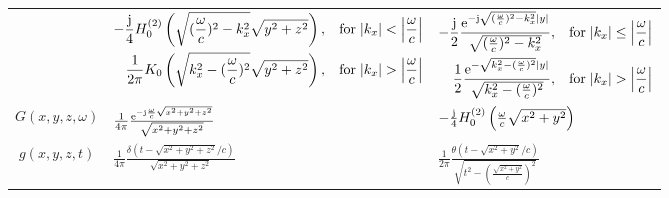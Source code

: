 \begin{table}[h!]
\begin{tabular}[h!]{  c | | l |	 l }
    &      
    \scriptsize
    $\begin{aligned}[t] %
	-\frac{\ti}{4} H_0^{(2)}\left( \sqrt{(\frac{\omega}{c})^2 - k_x^2 } \sqrt{y^2+z^2} \right),\hspace{3mm} \text{for} \hspace{1mm}|k_x|<\left| \frac{\omega}{c} \right| \\ \frac{1}{2\pi} K_0\left( \sqrt{k_x^2 - (\frac{\omega}{c})^2 } \sqrt{y^2+z^2} \right),\hspace{3mm}  \text{for} \hspace{1mm}|k_x|>\left| \frac{\omega}{c} \right| 
	\end{aligned}$ \normalsize
     &     
     \scriptsize	$\begin{aligned}[t]
	-\frac{\ti}{2}\frac{\te^{-\ti\sqrt{(\frac{\omega}{c})^2 - k_x^2 }|y|}}{\sqrt{(\frac{\omega}{c})^2 - k_x^2 }},\hspace{3mm} \text{for} \hspace{1mm}|k_x|		\leq			\left| \frac{\omega}{c} \right| \\
	\frac{1}{2}\frac{\te^{- \sqrt{k_x^2 -(\frac{\omega}{c})^2}|y|}}{\sqrt{k_x^2 -(\frac{\omega}{c})^2}},\hspace{3mm}  \text{for} \hspace{1mm}|k_x|>\left| 					\frac{\omega}{c} \right| 
	\end{aligned}$ \normalsize      \\ 
    $G(x,y,z,\omega)$ 				 &  $\frac{1}{4\pi}\frac{\mathrm{e}^{-\mathrm{j}\frac{\omega}{c}\sqrt{x^2+y^2+z^2}}}{\sqrt{x^2+y^2+z^2}}$ & \scriptsize$-\frac{\mathrm{j}}{4} H_0^{(2)}\left( \frac{\omega}{c} \sqrt{x^2+y^2} \right) $\normalsize  \\ 
    $g(x,y,z,t)$ 					 &  $\frac{1}{4\pi}\frac{\delta\left( t - \sqrt{x^2+y^2+z^2}/c \right)}{\sqrt{x^2+y^2+z^2}}$  & $\frac{1}{2\pi}\frac{\theta(t - \sqrt{x^2+y^2}/c)}{\sqrt{t^2 - \left(\frac{\sqrt{x^2+y^2}}{c}\right)^2}}$
    \end{tabular}
\end{table}
\FloatBarrier

